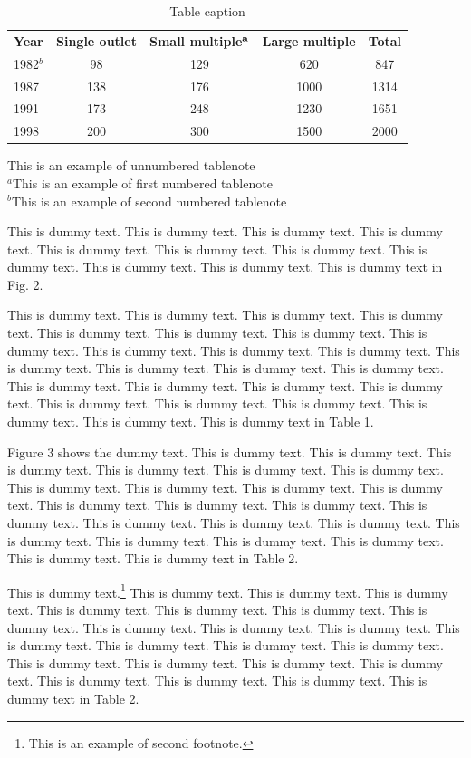 \documentclass{jpp}
\begin{document}
\begin{table}
\begin{center}
\caption{Table caption}
{\begin{tabular}{lcccc}
\textbf{Year} & \textbf{Single outlet} &  \textbf{Small multiple}$^{\bf a}$ & \textbf{Large multiple} & \textbf{Total}\\[6pt]
1982$^{b}$ & 98 & 129 & 620 & 847\\
1987 & 138 & 176 & 1000 & 1314\\
1991 & 173 & 248 & 1230 & 1651\\
1998 & 200 & 300 & 1500 & 2000\\[6pt]
\end{tabular}}{\par This is an example of unnumbered tablenote\\
$^{a}$This is an example of first numbered tablenote\\
$^{b}$This is an example of second numbered tablenote\\}
\end{center}
\end{table}

This is dummy text. This is dummy text. This is dummy text. This is dummy text. This is
dummy text. This is dummy text. This is dummy text. This is dummy text. This is dummy
text. This is dummy text. This is dummy text in Fig. 2.

This is dummy text. This is dummy text. This is dummy text. This is dummy text. This is
dummy text. This is dummy text. This is dummy text. This is dummy text. This is dummy
text. This is dummy text. This is dummy text. This is dummy text. This is dummy text. This
is dummy text. This is dummy text. This is dummy text. This is dummy text. This is dummy
text. This is dummy text. This is dummy text. This is dummy text. This is dummy text. This
is dummy text. This is dummy text. This is dummy text in Table 1.

Figure 3 shows the dummy text. This is dummy text. This is dummy text. This is dummy
text. This is dummy text. This is dummy text. This is dummy text. This is dummy text. This
is dummy text. This is dummy text. This is dummy text. This is dummy text. This is dummy
text. This is dummy text. This is dummy text. This is dummy text. This is dummy text. This
is dummy text. This is dummy text. This is dummy text. This is dummy text. This is dummy
text. This is dummy text. This is dummy text in Table 2.

This is dummy text.\footnote{This is an example of second footnote.} This is dummy text. This is dummy text. This is dummy text. This
is dummy text. This is dummy text. This is dummy text. This is dummy text. This is dummy
text. This is dummy text. This is dummy text. This is dummy text. This is dummy text. This
is dummy text. This is dummy text. This is dummy text. This is dummy text. This is dummy
text. This is dummy text. This is dummy text. This is dummy text. This is dummy text. This
is dummy text in Table 2.
\end{document}

